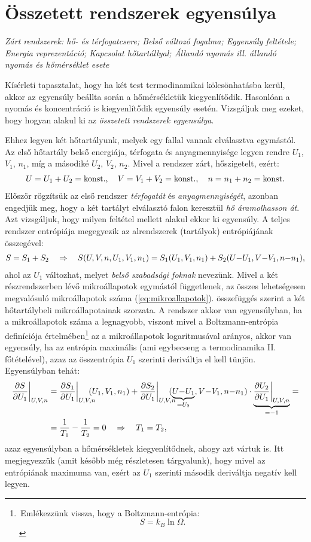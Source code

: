 \section{Összetett rendszerek egyensúlya}
\emph{Zárt rendszerek: hő- és térfogatcsere; Belső változó fogalma; Egyensúly feltétele; Energia reprezentáció; Kapcsolat hőtartállyal; Állandó nyomás ill. állandó nyomás és hőmérséklet esete}

Kísérleti tapasztalat, hogy ha két test termodinamikai kölcsönhatásba kerül, akkor az egyensúly beállta során a hőmérsékletük kiegyenlítődik. Hasonlóan a nyomás és koncentráció is kiegyenlítődik egyensúly esetén. Vizsgáljuk meg ezeket, hogy hogyan alakul ki az \emph{összetett rendszerek egyensúlya}.

Ehhez legyen két hőtartályunk, melyek egy fallal vannak elválasztva egymástól. Az első hőtartály belső energiája, térfogata és anyagmennyisége legyen rendre $U_1$, $V_1$, $n_1$, míg a másodiké $U_2$, $V_2$, $n_2$. Mivel a rendszer zárt, hőszigetelt, ezért:
\begin{align}
	U = U_1+U_2 = \textnormal{konst.},\quad V = V_1+V_2 = \textnormal{konst.},\quad n = n_1+n_2 =\textnormal{konst.}
\end{align}
Először rögzítsük az első rendszer \emph{térfogatát} és \emph{anyagmennyiségét}, azonban engedjük meg, hogy a két tartályt elválasztó falon keresztül \emph{hő áramolhasson át}. Azt vizsgáljuk, hogy milyen feltétel mellett alakul ekkor ki egyensúly. A teljes rendszer entrópiája megegyezik az alrendszerek (tartályok) entrópiájának összegével:
\begin{align}
	S = S_1+S_2\quad\Rightarrow\quad S(U,V,n,U_1,V_1,n_1)=S_1(U_1,V_1,n_1)+S_2(U{-}U_1,V{-}V_1,n{-}n_1),
\end{align}
ahol az $U_1$ változhat, melyet \emph{belső szabadsági foknak} nevezünk. Mivel a két részrendszerben lévő mikroállapotok egymástól függetlenek, az összes lehetségesen megvalósuló mikroállapotok száma (\ref{eq:mikroallapotok}). összefüggés szerint a két hőtartálybeli mikroállapotainak szorzata. A rendszer akkor van egyensúlyban, ha a mikroállapotok száma a legnagyobb, viszont mivel a Boltzmann-entrópia definíciója értelmében\footnote{\,Emlékezzünk vissza, hogy a Boltzmann-entrópia:
$$ S=k_B\ln\Omega.$$} az a mikroállapotok logaritmusával arányos, akkor van egyensúly, ha az entrópia maximális (ami egybecseng a termodinamika II. főtételével), azaz az összentrópia $U_1$ szerinti deriváltja el kell tünjön. Egyensúlyban tehát:
\begin{align}
\begin{split}
	\pd{S}{U_1}\bigg|_{U,V,n} &= \pd{S_1}{U_1}\bigg|_{U,V,n}\hspace{-3mm}(U_1,V_1,n_1)+\pd{S_2}{U_1}\bigg|_{U,V,n}\hspace{-3mm}(\underbrace{U{-}U_1}_{=U_2},V{-}V_1,n{-}n_1)\cdot \underbrace{\pd{U_2}{U_1}\bigg|_{U,V,n}}_{=-1} =\\
	&= \rec{T_1}-\rec{T_2} = 0\follows T_1=T_2,
\end{split}
\end{align}
azaz egyensúlyban a hőmérsékletek kiegyenlítődnek, ahogy azt vártuk is. Itt megjegyezzük (amit később még részletesen tárgyalunk), hogy mivel az entrópiának maximuma van, ezért az $U_1$ szerinti második deriváltja negatív kell legyen.

